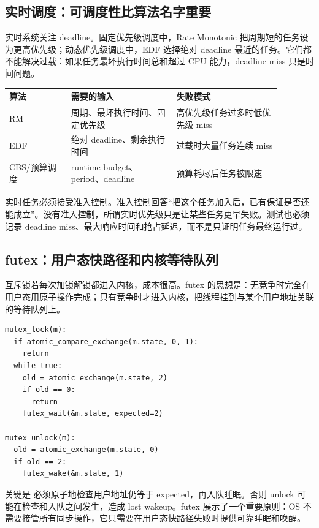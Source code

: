 \subsection{实时调度：可调度性比算法名字重要}

实时系统关注 deadline。固定优先级调度中，Rate Monotonic 把周期短的任务设为更高优先级；动态优先级调度中，EDF 选择绝对 deadline 最近的任务。它们都不能解决过载：如果任务最坏执行时间总和超过 CPU 能力，deadline miss 只是时间问题。

\begin{longtable}{|p{0.2\linewidth}|p{0.34\linewidth}|p{0.34\linewidth}|}
\toprule
算法 & 需要的输入 & 失败模式 \\
\midrule
RM & 周期、最坏执行时间、固定优先级 & 高优先级任务过多时低优先级 miss \\\tablerowrule
EDF & 绝对 deadline、剩余执行时间 & 过载时大量任务连续 miss \\\tablerowrule
CBS/预算调度 & runtime budget、period、deadline & 预算耗尽后任务被限速 \\
\bottomrule
\end{longtable}

实时任务必须接受准入控制。准入控制回答“把这个任务加入后，已有保证是否还能成立”。没有准入控制，所谓实时优先级只是让某些任务更早失败。测试也必须记录 deadline miss、最大响应时间和抢占延迟，而不是只证明任务最终运行过。

\subsection{futex：用户态快路径和内核等待队列}

互斥锁若每次加锁解锁都进入内核，成本很高。futex 的思想是：无竞争时完全在用户态用原子操作完成；只有竞争时才进入内核，把线程挂到与某个用户地址关联的等待队列上。

\begin{lstlisting}
mutex_lock(m):
  if atomic_compare_exchange(m.state, 0, 1):
    return
  while true:
    old = atomic_exchange(m.state, 2)
    if old == 0:
      return
    futex_wait(&m.state, expected=2)

mutex_unlock(m):
  old = atomic_exchange(m.state, 0)
  if old == 2:
    futex_wake(&m.state, 1)
\end{lstlisting}

关键是  必须原子地检查用户地址仍等于 expected，再入队睡眠。否则 unlock 可能在检查和入队之间发生，造成 lost wakeup。futex 展示了一个重要原则：OS 不需要接管所有同步操作，它只需要在用户态快路径失败时提供可靠睡眠和唤醒。

